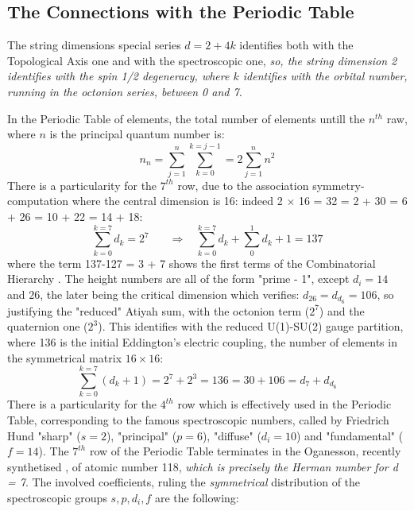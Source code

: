 \documentclass[a4paper,9pt]{article}
\newcounter{row}
\begin{document}
 
\subsection{The Connections with the Periodic Table}

The string dimensions special series $d= 2+4k$ identifies both with the Topological Axis one and with the spectroscopic one, \textit {so, the string dimension 2 identifies with the spin 1/2 degeneracy, where $k$ identifies with the orbital number, running in the octonion series, between 0 and 7.} 

In the Periodic Table of elements, the total number of elements untill the $n^{th}$ raw, where $n$ is the principal quantum number is:
\begin{equation}
n_n = \sum _{j=1}^{n}  \sum_{k=0}^{k=j-1} = 2 \sum _{j=1}^{n} n^2
 \end{equation}
There is a particularity for the $7^{th}$ row, due to the association symmetry-computation where the central dimension is 16: indeed 2 $\times$ 16 = 32 = 2 + 30 = 6 + 26 = 10 + 22 = 14 + 18:  
\begin{equation}
 \sum_{k=0}^{k=7} d_k = 2^7~~~~~~~~\Rightarrow~~~~  \sum_{k=0}^{k=7} d_k + \sum_0^1{d_k + 1} = 137
 \end{equation}
 where the term 137-127 = 3 + 7 shows the first terms of the Combinatorial Hierarchy \cite{Bastin}. The height numbers are all of the form "prime - 1", except $d_i = 14$ and $26$, the later being the critical dimension which verifies: $ d_{26} = d_{d_6} = 106 $, so justifying the "reduced" Atiyah sum, with the octonion term ($2^7$) and the quaternion one ($2^3$). This identifies with the reduced U(1)-SU(2) gauge partition, where 136 is the initial Eddington's electric coupling, the number of elements in the symmetrical matrix $16\times16$: 
\begin{equation}
 \sum_{k=0}^{k=7} (d_k+1)= 2^7 + 2^3 = 136 = 30 + 106 = d_7 + d_{d_6}
 \end{equation}
There is a particularity for the $4^{th}$ row which is effectively used in the Periodic Table, corresponding to the famous spectroscopic numbers, called by Friedrich Hund "sharp" ($s = 2$), "principal" ($p = 6$), "diffuse" ($d_i = 10$) and "fundamental" ($f = 14$). The $7^{th}$ row of the Periodic Table terminates in the Oganesson, recently synthetised \cite{Oganessian}, of atomic number 118, \textit{which is precisely the Herman number for d = 7}. The involved coefficients, ruling the \textit{symmetrical} distribution of the spectroscopic groups $s,p,d_i,f$ are the following:
\end{document}
